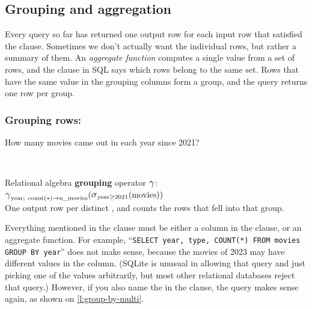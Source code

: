 \subsection{Grouping and aggregation}

Every query so far has returned one output row for each input row that satisfied the  clause.
Sometimes we don't actually want the individual rows, but rather a summary of them.
An \emph{aggregate function} computes a single value from a set of rows, and the  clause in SQL says which rows belong to the same set.
Rows that have the same value in the grouping columns form a group, and the query returns one row per group.

\begin{frame}
    \label{s:group-by}
    \frametitle{Grouping rows: }
    How many movies came out in each year since 2021?
    \inputminted[fontsize=\footnotesize]{sql}{code/sql-group-by.sql}
    \vspace{0.3em}
    {\footnotesize}\\[0.8em]
    Relational algebra \textbf{grouping} operator $\raop{\gamma}$:\\
    \hspace*{1em}$\raop{\gamma}_{\ra{year};\ \ra{count}(*) \to \ra{n\_movies}}(\raop{\sigma}_{\ra{year} \ge 2021}(\ra{movies}))$\\[0.8em]
    One output row per distinct , and  counts the rows that fell into that group.
\end{frame}
\label{l:group-by}

Everything mentioned in the  clause must be either a column in the  clause, or an aggregate function.
For example, ``\texttt{SELECT year, type, COUNT(*) FROM movies GROUP BY year}'' does not make sense, because the movies of 2023 may have different values in the  column.
(SQLite is unusual in allowing that query and just picking one of the  values arbitrarily, but most other relational databases reject that query.)
However, if you also name the  in the  clause, the query makes sense again, as shown on \autoref{l:group-by-multi}.

